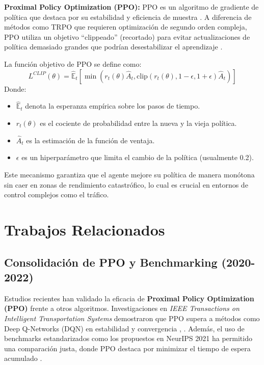 \documentclass[12pt, a4paper]{report}
\begin{document}
\textbf{Proximal Policy Optimization (PPO):}
PPO es un algoritmo de gradiente de política que destaca por su estabilidad y eficiencia de muestra \cite{37}. A diferencia de métodos como TRPO que requieren optimización de segundo orden compleja, PPO utiliza un objetivo ``clippeado'' (recortado) para evitar actualizaciones de política demasiado grandes que podrían desestabilizar el aprendizaje \cite{40}.

La función objetivo de PPO se define como:
\begin{equation}
    L^{CLIP}(\theta) = \hat{\mathbb{E}}_t [ \min(r_t(\theta)\hat{A}_t, \text{clip}(r_t(\theta), 1-\epsilon, 1+\epsilon)\hat{A}_t) ]
\end{equation}
Donde:
\begin{itemize}
    \item $\hat{\mathbb{E}}_t$ denota la esperanza empírica sobre los pasos de tiempo.
    \item $r_t(\theta)$ es el cociente de probabilidad entre la nueva y la vieja política.
    \item $\hat{A}_t$ es la estimación de la función de ventaja.
    \item $\epsilon$ es un hiperparámetro que limita el cambio de la política (usualmente 0.2).
\end{itemize}

Este mecanismo garantiza que el agente mejore su política de manera monótona sin caer en zonas de rendimiento catastrófico, lo cual es crucial en entornos de control complejos como el tráfico.

\section{Trabajos Relacionados}

\subsection{Consolidación de PPO y Benchmarking (2020-2022)}
Estudios recientes han validado la eficacia de \textbf{Proximal Policy Optimization (PPO)} frente a otros algoritmos. Investigaciones en \textit{IEEE Transactions on Intelligent Transportation Systems} demostraron que PPO supera a métodos como Deep Q-Networks (DQN) en estabilidad y convergencia \cite{33}, \cite{35}. Además, el uso de benchmarks estandarizados como los propuestos en NeurIPS 2021 \cite{11} ha permitido una comparación justa, donde PPO destaca por minimizar el tiempo de espera acumulado \cite{49}.
\end{document}
